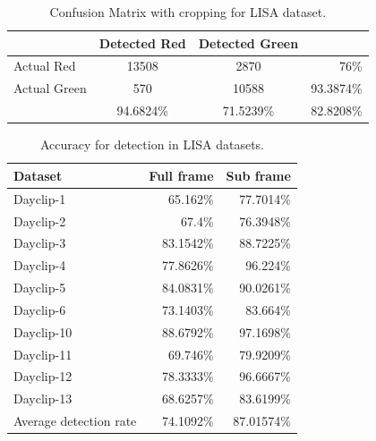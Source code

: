 \begin{table}[h!]
  \centering
  \caption{Confusion Matrix with cropping for LISA dataset.}
  \label{t:con_crp}
  \begin{tabular}{  l | c | c | r }
   
     & Detected Red & Detected Green &  \\
    \hline
    Actual Red & 13508 & 2870 & 76\% \\
    \hline
    Actual Green & 570 & 10588 & 93.3874\% \\
    \hline
    & 94.6824\% & 71.5239\% & 82.8208\% \\
    
  \end{tabular}
\end{table}

\begin{table}[h!]
  \centering
  \caption{Accuracy for detection in LISA datasets.}
  \label{t:acc_stat}
  \begin{tabular}{  l  r  r }
    \rowcolor{gray!50}
    Dataset & Full frame & Sub frame \\
    \hline
    Dayclip-1 & 65.162\% & 77.7014\% \\
    Dayclip-2 & 67.4\% & 76.3948\% \\
    Dayclip-3 & 83.1542\% & 88.7225\% \\
    Dayclip-4 & 77.8626\% & 96.224\% \\
    Dayclip-5 & 84.0831\% & 90.0261\% \\
    Dayclip-6 & 73.1403\% & 83.664\% \\
    Dayclip-10 & 88.6792\% & 97.1698\% \\
    Dayclip-11 & 69.746\% & 79.9209\% \\
    Dayclip-12 & 78.3333\% & 96.6667\% \\
    Dayclip-13 & 68.6257\% & 83.6199\%\\
    \hline
    Average detection rate & 74.1092\% & 87.01574\% \\
  \end{tabular}
\end{table}




